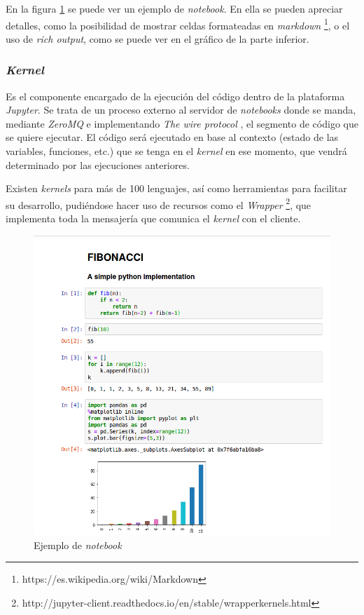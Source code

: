 \documentclass[11pt,spanish,listoffigures]{tfgetsinf}
\begin{document}
En la figura \ref{fig:notebook} se puede ver un ejemplo de \textit{notebook}. En ella se pueden apreciar detalles, como la posibilidad de mostrar celdas formateadas en \textit{markdown} \footnote{https://es.wikipedia.org/wiki/Markdown}, o el uso de \textit{rich output}, como se puede ver en el gráfico de la parte inferior.


\subsubsection{\textit{Kernel}}
\label{subsec:estructura-kernel}

Es el componente encargado de la ejecución del código dentro de la plataforma \textit{Jupyter}. Se trata de un proceso externo al servidor de \textit{notebooks} donde se manda, mediante \textit{ZeroMQ} e implementando \textit{The wire protocol} \cite{wire-protocol}, el segmento de código que se quiere ejecutar. El código será ejecutado en base al contexto (estado de las variables, funciones, etc.) que se tenga en el \textit{kernel} en ese momento, que vendrá determinado por las ejecuciones anteriores.

Existen \textit{kernels} para más de 100 lenguajes, así como herramientas para facilitar su desarrollo, pudiéndose hacer uso de recursos como el \textit{Wrapper} \footnote{http://jupyter-client.readthedocs.io/en/stable/wrapperkernels.html}, que implementa toda la mensajería que comunica el \textit{kernel} con el cliente.

\begin{figure}[H]
	\centering
  	\includegraphics[width=\linewidth]{notebook.png}
  	\caption{Ejemplo de \textit{notebook}}
  	\label{fig:notebook}
\end{figure}
\end{document}
